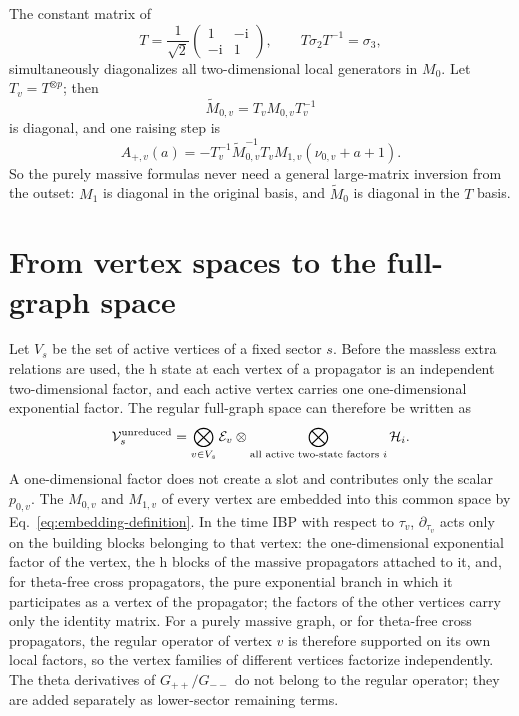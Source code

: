 \documentclass[11pt,a4paper]{article}
\newcommand{\ii}{\mathrm i}
\newcommand{\cV}{\mathcal V}
\newcommand{\cE}{\mathcal E}
\newcommand{\cH}{\mathcal H}
\begin{document}
The constant matrix of \cite{Chen:2023eic}
\begin{equation}
 T=\frac1{\sqrt2}
 \begin{pmatrix}1&-\ii\\-\ii&1\end{pmatrix},
 \qquad
 T\sigma_2T^{-1}=\sigma_3,
 \label{eq:paper-T}
\end{equation}
simultaneously diagonalizes all two-dimensional local generators in $M_0$. Let $T_v=T^{\otimes p}$; then
\begin{equation}
 \widetilde M_{0,v}=T_vM_{0,v}T_v^{-1}
\end{equation}
is diagonal, and one raising step is
\begin{equation}
 A_{+,v}(a)
 =-T_v^{-1}\widetilde M_{0,v}^{-1}T_v
 M_{1,v}(\nu_{0,v}+a+1).
 \label{eq:Aplus-local}
\end{equation}
So the purely massive formulas never need a general large-matrix inversion from the outset: $M_1$ is diagonal in the original basis, and $\widetilde M_0$ is diagonal in the $T$ basis.

\section{From vertex spaces to the full-graph space}

Let $V_s$ be the set of active vertices of a fixed sector $s$. Before the massless extra relations are used, the h state at each vertex of a propagator is an independent two-dimensional factor, and each active vertex carries one one-dimensional exponential factor. The regular full-graph space can therefore be written as
\begin{equation}
 \cV_s^{\rm unreduced}
 =\bigotimes_{v\in V_s}\cE_v
 \otimes
 \bigotimes_{\text{all active two-state factors }i}\cH_i.
 \label{eq:global-unreduced-space}
\end{equation}
A one-dimensional factor does not create a slot and contributes only the scalar $p_{0,v}$. The $M_{0,v}$ and $M_{1,v}$ of every vertex are embedded into this common space by Eq.~\eqref{eq:embedding-definition}. In the time IBP with respect to $\tau_v$, $\partial_{\tau_v}$ acts only on the building blocks belonging to that vertex: the one-dimensional exponential factor of the vertex, the h blocks of the massive propagators attached to it, and, for theta-free cross propagators, the pure exponential branch in which it participates as a vertex of the propagator; the factors of the other vertices carry only the identity matrix. For a purely massive graph, or for theta-free cross propagators, the regular operator of vertex $v$ is therefore supported on its own local factors, so the vertex families of different vertices factorize independently. The theta derivatives of $G_{++}/G_{--}$ do not belong to the regular operator; they are added separately as lower-sector remaining terms.
\end{document}
